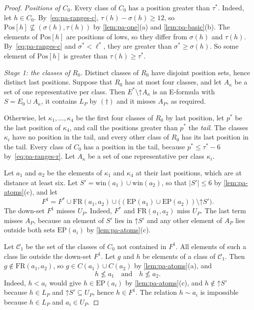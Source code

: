 \documentclass[pdflatex,sn-mathphys-num]{sn-jnl}%
\theoremstyle{thmstyleone}%
\theoremstyle{thmstyletwo}%
\theoremstyle{thmstylethree}%
\newcommand{\upp}{\mathord{\uparrow}}%
\newcommand{\Pos}{\mathrm{Pos}}%
\newcommand{\win}{\mathrm{win}}%
\newcommand{\FR}{\mathrm{FR}}%
\newcommand{\EP}{\mathrm{EP}}%
\begin{document}
\begin{proof}
\emph{Positions of $C_0$.}
Every class of $C_0$ has a position greater than $\tau^*$.
Indeed, let $h \in C_0$.
By~\eqref{eq:pa-ranges-c}, $\tau(h) - \sigma(h) \geq 12$, so $\Pos[h] \not\subseteq (\sigma(h), \tau(h))$ by \cref{lem:pa-one}(a) and \cref{lem:pa-basic}(b).
The elements of $\Pos[h]$ are positions of lows, so they differ from $\sigma(h)$ and $\tau(h)$.
By~\eqref{eq:pa-ranges-c} and $\sigma^* < \ell^*$, they are greater than $\sigma^* \geq \sigma(h)$.
So some element of $\Pos[h]$ is greater than $\tau(h) \geq \tau^*$.

\emph{Stage 1: the classes of $R_0$.}
Distinct classes of $R_0$ have disjoint position sets, hence distinct last positions.
Suppose that $R_0$ has at most four classes, and let $A_\kappa$ be a set of one representative per class.
Then $E^* \setminus \upp A_\kappa$ is an E-formula with $S = E_0 \cup A_\kappa$, it contains $L_P$ by $(\dagger)$ and it misses $A_P$, as required.

Otherwise, let $\kappa_1, \dots, \kappa_4$ be the first four classes of $R_0$ by last position, let $p^*$ be the last position of $\kappa_4$, and call the positions greater than $p^*$ the \emph{tail}.
The classes $\kappa_i$ have no position in the tail, and every other class of $R_0$ has its last position in the tail.
Every class of $C_0$ has a position in the tail, because $p^* \leq \tau^* - 6$ by~\eqref{eq:pa-ranges-r}.
Let $A_\kappa$ be a set of one representative per class $\kappa_i$.

Let $a_1$ and $a_2$ be the elements of $\kappa_1$ and $\kappa_4$ at their last positions, which are at distance at least six.
Let $S' = \win(a_1) \cup \win(a_2)$, so that $|S'| \leq 6$ by \cref{lem:pa-atoms}(c), and let
\[
F^1 = F^* \cup \FR(a_1, a_2) \cup \bigl((\EP(a_1) \cup \EP(a_2)) \setminus \upp S'\bigr).
\]
The down-set $F^1$ misses $U_P$.
Indeed, $F^*$ and $\FR(a_1, a_2)$ miss $U_P$.
The last term misses $A_P$, because an element of $S'$ lies in $\upp S'$ and any other element of $A_P$ lies outside both sets $\EP(a_i)$ by \cref{lem:pa-atoms}(c).

Let $\mathcal{C}_1$ be the set of the classes of $C_0$ not contained in $F^1$.
All elements of such a class lie outside the down-set $F^1$.
Let $g$ and $h$ be elements of a class of $\mathcal{C}_1$.
Then $g \notin \FR(a_1, a_2)$, so $g \in C(a_1) \cup C(a_2)$ by \cref{lem:pa-atoms}(a), and
\begin{equation}
\label{eq:pa-not-below}
h \not\leq a_1 \quad\text{and}\quad h \not\leq a_2.
\end{equation}
Indeed, $h < a_i$ would give $h \in \EP(a_i)$ by \cref{lem:pa-atoms}(c), and $h \notin \upp S'$ because $h \in L_P$ and $\upp S' \subseteq U_P$, hence $h \in F^1$.
The relation $h \sim a_i$ is impossible because $h \in L_P$ and $a_i \in U_P$.


\end{proof}
\end{document}
